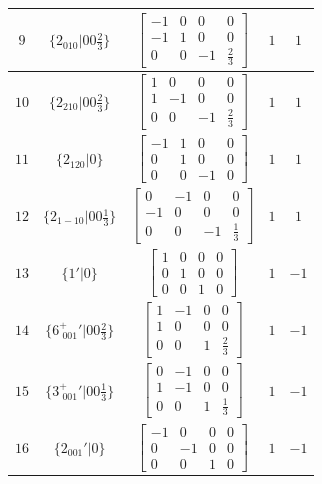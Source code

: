 \documentclass[fleqn,8pt]{jsarticle}
\begin{document}
\begin{longtable}{ccccc}
$ 9 $ & $ \{2{}_{010}|0 0 \frac{2}{3}\} $ & $ \begin{bmatrix} -1 & 0 & 0 & 0 \\ -1 & 1 & 0 & 0 \\ 0 & 0 & -1 & \frac{2}{3} \end{bmatrix} $ & $ 1 $ & $ 1 $ \\ \hline
$ 10 $ & $ \{2{}_{210}|0 0 \frac{2}{3}\} $ & $ \begin{bmatrix} 1 & 0 & 0 & 0 \\ 1 & -1 & 0 & 0 \\ 0 & 0 & -1 & \frac{2}{3} \end{bmatrix} $ & $ 1 $ & $ 1 $ \\ \hline
$ 11 $ & $ \{2{}_{120}|0\} $ & $ \begin{bmatrix} -1 & 1 & 0 & 0 \\ 0 & 1 & 0 & 0 \\ 0 & 0 & -1 & 0 \end{bmatrix} $ & $ 1 $ & $ 1 $ \\ \hline
$ 12 $ & $ \{2{}_{1-10}|0 0 \frac{1}{3}\} $ & $ \begin{bmatrix} 0 & -1 & 0 & 0 \\ -1 & 0 & 0 & 0 \\ 0 & 0 & -1 & \frac{1}{3} \end{bmatrix} $ & $ 1 $ & $ 1 $ \\ \hline
$ 13 $ & $ \{1{}'|0\} $ & $ \begin{bmatrix} 1 & 0 & 0 & 0 \\ 0 & 1 & 0 & 0 \\ 0 & 0 & 1 & 0 \end{bmatrix} $ & $ 1 $ & $ -1 $ \\ \hline
$ 14 $ & $ \{6^{+}_{\,\,001}{}'|0 0 \frac{2}{3}\} $ & $ \begin{bmatrix} 1 & -1 & 0 & 0 \\ 1 & 0 & 0 & 0 \\ 0 & 0 & 1 & \frac{2}{3} \end{bmatrix} $ & $ 1 $ & $ -1 $ \\ \hline
$ 15 $ & $ \{3^{+}_{\,\,001}{}'|0 0 \frac{1}{3}\} $ & $ \begin{bmatrix} 0 & -1 & 0 & 0 \\ 1 & -1 & 0 & 0 \\ 0 & 0 & 1 & \frac{1}{3} \end{bmatrix} $ & $ 1 $ & $ -1 $ \\ \hline
$ 16 $ & $ \{2{}_{001}{}'|0\} $ & $ \begin{bmatrix} -1 & 0 & 0 & 0 \\ 0 & -1 & 0 & 0 \\ 0 & 0 & 1 & 0 \end{bmatrix} $ & $ 1 $ & $ -1 $ \\ \hline

\end{longtable}
\end{document}
